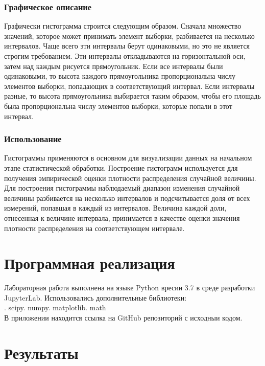\documentclass{article}
\begin{document}
	\subsubsection{Графическое описание}
	\noindent Графически гистограмма строится следующим образом. Сначала множество значений, которое может принимать элемент выборки, разбивается на несколько интервалов. Чаще всего эти интервалы берут одинаковыми, но это не является строгим требованием. Эти интервалы откладываются на горизонтальной оси, затем над каждым рисуется прямоугольник. Если все интервалы были одинаковыми, то высота каждого прямоугольника пропорциональна числу элементов выборки, попадающих в соответствующий интервал. Если интервалы разные, то высота прямоугольника выбирается таким образом, чтобы его площадь была пропорциональна числу элементов выборки, которые попали в этот интервал.
	
	\subsubsection{Использование}
	\noindent Гистограммы применяются в основном для визуализации данных на начальном этапе статистической обработки. \newline Построение гистограмм используется для получения эмпирической оценки плотности распределения случайной величины. Для построения гистограммы наблюдаемый диапазон изменения случайной величины разбивается на несколько интервалов и подсчитывается доля от всех измерений, попавшая в каждый из интервалов. Величина каждой доли, отнесенная к величине интервала, принимается в качестве оценки значения плотности распределения на соответствующем интервале.

\section {Программная реализация} 	
\noindent Лабораторная работа выполнена на языке Python вресии 3.7 в среде разработки JupyterLab. Использовались дополнительные библиотеки:\\ . scipy. numpy. matplotlib. math\newline \\
В приложении находится ссылка на GitHub репозиторий с исходныи кодом.

\section {Результаты} 
\end{document}
